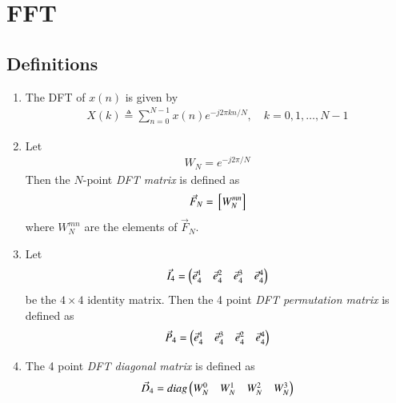 \documentclass[journal,12pt,twocolumn]{IEEEtran}
\renewcommand\thesection{\arabic{section}}
\begin{document}
		\section{FFT}
		\subsection{Definitions}
		\begin{enumerate}[label=\arabic*.,ref=\thesection.\theenumi]
			\item The DFT of $x(n)$ is given by
			\begin{align}
				X(k) \triangleq \sum_{n=0}^{N-1} x(n) e^{-j 2 \pi k n / N}, \quad k=0,1, \ldots, N-1
			\end{align}
			\item Let 
			\begin{align}
				W_{N} = e^{-j2\pi/N} 
			\end{align}
			Then the $N$-point {\em DFT matrix} is defined as 
			\begin{align}
				\vec{F}_{N} = {}\left[W_{N}^{mn}\right]
			\end{align}
			where $W_{N}^{mn}$ are the elements of $\vec{F}_{N}$.
			\item Let 
			\begin{align}
				\vec{I}_4 = \begin{pmatrix}\vec{e}_4^{1} &\vec{e}_4^{2} &\vec{e}_4^{3} &\vec{e}_4^{4} \end{pmatrix}
			\end{align}
			be the $4\times 4$ identity matrix.  Then the 4 point {\em DFT permutation matrix} is defined as 
			\begin{align}
				\vec{P}_4 = \begin{pmatrix}\vec{e}_4^{1} &\vec{e}_4^{3} &\vec{e}_4^{2} &\vec{e}_4^{4}\end{pmatrix}
			\end{align}
			\item The 4 point {\em DFT diagonal matrix} is defined as 
			\begin{align}
				\vec{D}_4 = diag\begin{pmatrix}W_{N}^{0} & W_{N}^{1} & W_{N}^{2} & W_{N}^{3}\end{pmatrix}
			\end{align}
		\end{enumerate}
\end{document}
